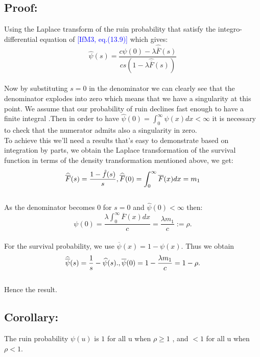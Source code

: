  \subsection*{Proof:}
 Using the Laplace transform of the ruin probability that satisfy the integro-differential equation of \textcolor{blue}{[IfM3, eq.(13.9)]} which gives: \\
 \begin{equation}
 \hat{\psi}(s)= \frac{c\psi(0)- \lambda \widehat{\overline{F}}(s)}{cs(1-\lambda \widehat{\overline{F}}(s))}
 \end{equation} \\
 Now by substituting $s=0$ in the denominator we can clearly see that the denominator explodes into zero which means that we have a singularity at this point. We assume that our probability of ruin declines fast enough to have a finite integral .Then in order to have $\widehat{\psi}(0)=\int_{0}^{\infty}\psi(x)dx < \infty$ it is necessary to check that the numerator admits also a singularity in zero. \\
 To achieve this we'll need a results that's easy to demonstrate based on integration by parts, we obtain the Laplace transformation of the survival function in terms of the density transformation mentioned above, we get: \\
 \begin{equation}
 \widehat{\overline{F}}(s)= \frac{1-\hat{f}(s)}{s} , \\ \widehat{\overline{F}}(0)= \int_{0}^{\infty}\overline{F}(x)dx = m_{1}
 \end{equation}\\
 As the denominator becomes $0$ for $s=0$ and $\widehat{\psi}(0)<\infty$ then: \\
 \begin{equation}
 \psi(0) =\frac{\lambda \int_{0}^{\infty}\overline{F}(x)dx}{c} =\frac{\lambda m_{1}}{c} := \rho.
 \end{equation}\\
 For the survival probability, we use $ \overline{\psi}(x)= 1- \psi (x)$. Thus we obtain
\begin{equation}
  \widehat{\overline{\psi}}(s) =\frac{1}{s} - \widehat{\psi}(s). , \\ \overline{\psi}(0)= 1- \frac{\lambda m_{1}}{c} = 1-\rho.
  \end{equation} \\
 Hence the result.

 \subsection{Corollary:}
 The ruin probability $\psi(u)$ is  $1$ for all u when $\rho \geq 1$ , and $< 1$ for all u when $ \rho< 1$.
 \newpage

